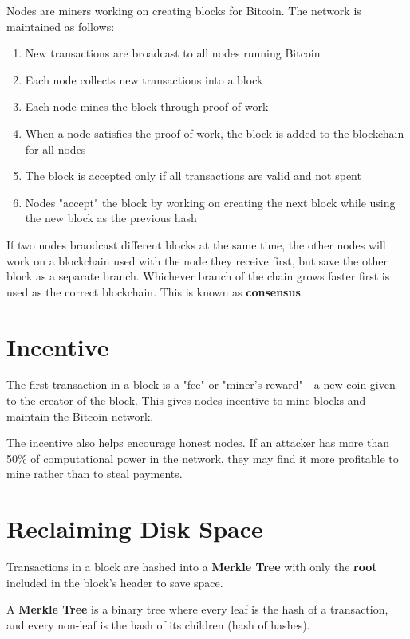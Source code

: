 \documentclass[11pt, letterpaper]{template}
\begin{document}
Nodes are miners working on creating blocks for Bitcoin. The network is maintained as follows:

\begin{enumerate}
	\item New transactions are broadcast to all nodes running Bitcoin
	\item Each node collects new transactions into a block
	\item Each node mines the block through proof-of-work
	\item When a node satisfies the proof-of-work, the block is added to the blockchain for all nodes
	\item The block is accepted only if all transactions are valid and not spent
	\item Nodes "accept" the block by working on creating the next block while using the new block as the previous hash
\end{enumerate}

If two nodes braodcast different blocks at the same time, the other nodes will work on a blockchain used with the node they receive first, but save the other block as a separate branch. Whichever branch of the chain grows faster first is used as the correct blockchain. This is known as \textbf{consensus}.

\section{Incentive}

The first transaction in a block is a "fee" or "miner's reward"---a new coin given to the creator of the block. This gives nodes incentive to mine blocks and maintain the Bitcoin network.

The incentive also helps encourage honest nodes. If an attacker has more than 50\% of computational power in the network, they may find it more profitable to mine rather than to steal payments.

\section{Reclaiming Disk Space}

Transactions in a block are hashed into a \textbf{Merkle Tree} with only the \textbf{root} included in the block's header to save space. 

A \textbf{Merkle Tree} is a binary tree where every leaf is the hash of a transaction, and every non-leaf is the hash of its children (hash of hashes).
\end{document}
